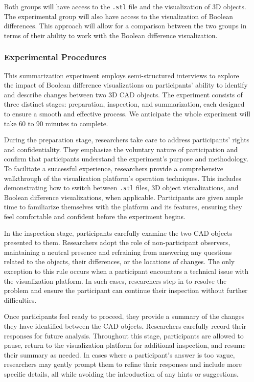 \documentclass[sigconf,authorversion,nonacm]{acmart}
\begin{document}
Both groups will have access to the \texttt{.stl} file and the visualization of 3D objects. The experimental group will also have access to the visualization of Boolean differences. This approach will allow for a comparison between the two groups in terms of their ability to work with the Boolean difference visualization.
\subsubsection{Experimental Procedures}
This summarization experiment employs semi-structured interviews to explore the impact of Boolean difference visualizations on participants' ability to identify and describe changes between two 3D CAD objects.
The experiment consists of three distinct stages: preparation, inspection, and summarization, each designed to ensure a smooth and effective process. We anticipate the whole experiment will take 60 to 90 minutes to complete.

During the preparation stage, researchers take care to address participants' rights and confidentiality. They emphasize the voluntary nature of participation and confirm that participants understand the experiment's purpose and methodology.
To facilitate a successful experience, researchers provide a comprehensive walkthrough of the visualization platform's operation techniques. This includes demonstrating how to switch between \texttt{.stl} files, 3D object visualizations, and Boolean difference visualizations, when applicable.
Participants are given ample time to familiarize themselves with the platform and its features, ensuring they feel comfortable and confident before the experiment begins.

In the inspection stage, participants carefully examine the two CAD objects presented to them. Researchers adopt the role of non-participant observers, maintaining a neutral presence and refraining from answering any questions related to the objects, their differences, or the locations of changes.
The only exception to this rule occurs when a participant encounters a technical issue with the visualization platform.
In such cases, researchers step in to resolve the problem and ensure the participant can continue their inspection without further difficulties.

Once participants feel ready to proceed, they provide a summary of the changes they have identified between the CAD objects. Researchers carefully record their responses for future analysis.
Throughout this stage, participants are allowed to pause, return to the visualization platform for additional inspection, and resume their summary as needed. In cases where a participant's answer is too vague,
researchers may gently prompt them to refine their responses and include more specific details, all while avoiding the introduction of any hints or suggestions.
\end{document}
